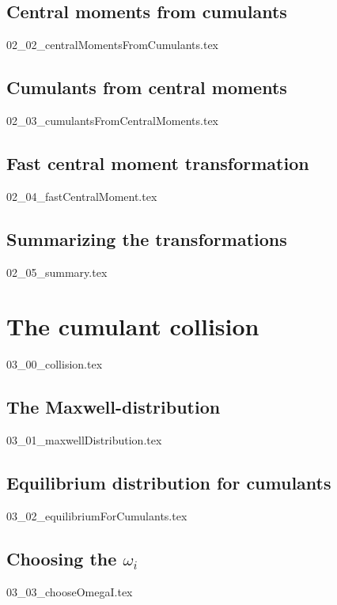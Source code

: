 \documentclass[12pt,a4paper,twoside]{article}
\begin{document}
\subsection{Central moments from cumulants}
\label{sub: Central moments from cumulants}
{02_02_centralMomentsFromCumulants.tex}

\subsection{Cumulants from central moments}
\label{sub: Cumulants from central moments}
{02_03_cumulantsFromCentralMoments.tex}

\subsection{Fast central moment transformation}
\label{sub: Fast central moment transformation}
{02_04_fastCentralMoment.tex}

\subsection{Summarizing the transformations}
\label{sub: Summarizing the transformations}
{02_05_summary.tex}

\section{The cumulant collision}
\label{sec: The cumulant collision}
{03_00_collision.tex}

\subsection{The Maxwell-distribution}
\label{sub: The Maxwell-distribution}
{03_01_maxwellDistribution.tex}

\subsection{Equilibrium distribution for cumulants}
\label{sub: Equilibrium distribution for cumulants}
{03_02_equilibriumForCumulants.tex}

\subsection{Choosing the \texorpdfstring{$\omega_i$}{omega i}}
\label{sub: Choosing the omega i}
{03_03_chooseOmegaI.tex}
\end{document}
